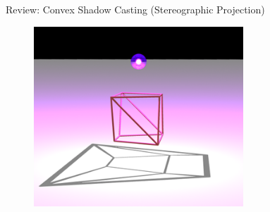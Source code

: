 \documentclass{beamer}
\begin{document}
\begin{frame}{Review: Convex Shadow Casting (Stereographic Projection)}

\begin{figure}[t]
    \includegraphics[width=0.7\textwidth]{shadow.png}
\end{figure}

\end{frame}
\end{document}
